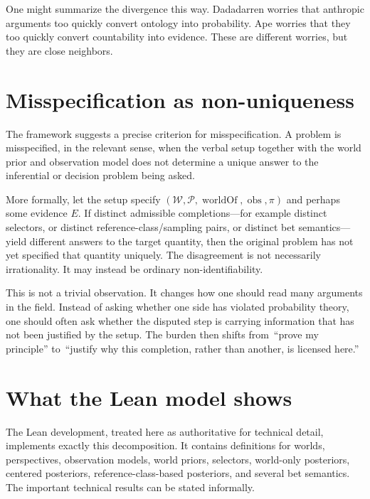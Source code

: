 \documentclass[11pt]{article}
\newcommand{\1}{\mathbf{1}}
\newcommand{\W}{\mathcal{W}}
\newcommand{\Persp}{\mathcal{P}}
\begin{document}
One might summarize the divergence this way. Dadadarren worries that anthropic arguments too quickly convert ontology into probability. Ape worries that they too quickly convert countability into evidence. These are different worries, but they are close neighbors.

\section{Misspecification as non-uniqueness}

The framework suggests a precise criterion for misspecification. A problem is misspecified, in the relevant sense, when the verbal setup together with the world prior and observation model does not determine a unique answer to the inferential or decision problem being asked.

More formally, let the setup specify $(\W,\Persp,\operatorname{worldOf},\operatorname{obs},\pi)$ and perhaps some evidence $E$. If distinct admissible completions---for example distinct selectors, or distinct reference-class/sampling pairs, or distinct bet semantics---yield different answers to the target quantity, then the original problem has not yet specified that quantity uniquely. The disagreement is not necessarily irrationality. It may instead be ordinary non-identifiability.

This is not a trivial observation. It changes how one should read many arguments in the field. Instead of asking whether one side has violated probability theory, one should often ask whether the disputed step is carrying information that has not been justified by the setup. The burden then shifts from \,``prove my principle'' to \,``justify why this completion, rather than another, is licensed here.''

\section{What the Lean model shows}

The Lean development, treated here as authoritative for technical detail, implements exactly this decomposition. It contains definitions for worlds, perspectives, observation models, world priors, selectors, world-only posteriors, centered posteriors, reference-class-based posteriors, and several bet semantics. The important technical results can be stated informally.
\end{document}
